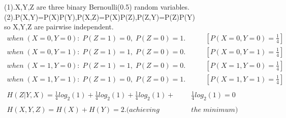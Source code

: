 \documentclass[UTF8,oneside]{article}
\begin{document}
\begin{center}
(1).X,Y,Z are three binary Bernoulli(0.5) random variables.\\
(2).P(X,Y)=P(X)P(Y),P(X,Z)=P(X)P(Z),P(Z,Y)=P(Z)P(Y)\\
so X,Y,Z are pairwise independent.
\begin{align*}
when \;(X=0,Y=0):\;P(Z=1)=0,\;P(Z=0)=1.&\qquad  [P(X=0,Y=0)=\frac{1}{4}]\\
when \;(X=0,Y=1):\;P(Z=1)=1,\;P(Z=0)=0. &\qquad [P(X=0,Y=1)=\frac{1}{4}]\\
when \;(X=1,Y=0):\;P(Z=1)=1,\;P(Z=0)=0. &\qquad [P(X=1,Y=0)=\frac{1}{4}]\\
when \;(X=1,Y=1):\;P(Z=1)=0,\;P(Z=0)=1. &\qquad [P(X=1,Y=1)=\frac{1}{4}]\\
\\
H(Z|Y,X)=\frac{1}{4}log_2(1)+\frac{1}{4}log_2(1)+\frac{1}{4}log_2(1)+&\frac{1}{4}log_2(1)=0\\
\\
H(X,Y,Z)=H(X)+H(Y)=2.(achieving\; &the\; minimum)
\end{align*}
\end{center}
\end{document}
